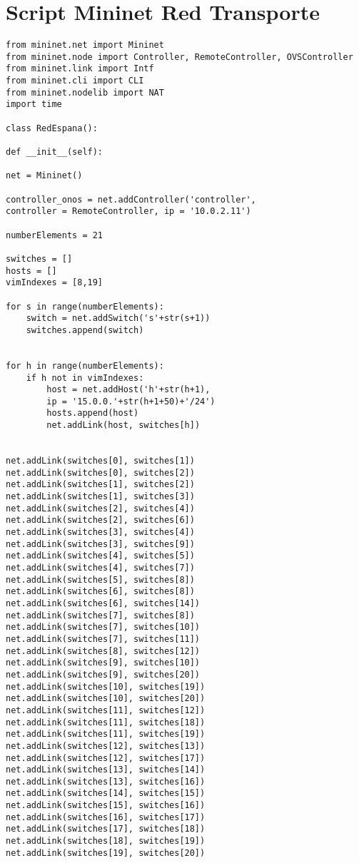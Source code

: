 \chapter{Script Mininet Red Transporte}
\label{sec:scriptmininet}

\begin{lstlisting}
from mininet.net import Mininet
from mininet.node import Controller, RemoteController, OVSController
from mininet.link import Intf
from mininet.cli import CLI
from mininet.nodelib import NAT
import time

class RedEspana():

def __init__(self):

net = Mininet()

controller_onos = net.addController('controller', 
controller = RemoteController, ip = '10.0.2.11')

numberElements = 21

switches = []
hosts = []
vimIndexes = [8,19]

for s in range(numberElements):
	switch = net.addSwitch('s'+str(s+1))
	switches.append(switch)


for h in range(numberElements):
	if h not in vimIndexes:
		host = net.addHost('h'+str(h+1), 
		ip = '15.0.0.'+str(h+1+50)+'/24')
		hosts.append(host)
		net.addLink(host, switches[h])


net.addLink(switches[0], switches[1])
net.addLink(switches[0], switches[2])
net.addLink(switches[1], switches[2])
net.addLink(switches[1], switches[3])
net.addLink(switches[2], switches[4])
net.addLink(switches[2], switches[6])
net.addLink(switches[3], switches[4])
net.addLink(switches[3], switches[9])
net.addLink(switches[4], switches[5])
net.addLink(switches[4], switches[7])
net.addLink(switches[5], switches[8])
net.addLink(switches[6], switches[8])
net.addLink(switches[6], switches[14])
net.addLink(switches[7], switches[8])
net.addLink(switches[7], switches[10])
net.addLink(switches[7], switches[11])
net.addLink(switches[8], switches[12])
net.addLink(switches[9], switches[10])
net.addLink(switches[9], switches[20])
net.addLink(switches[10], switches[19])
net.addLink(switches[10], switches[20])
net.addLink(switches[11], switches[12])
net.addLink(switches[11], switches[18])
net.addLink(switches[11], switches[19])
net.addLink(switches[12], switches[13])
net.addLink(switches[12], switches[17])
net.addLink(switches[13], switches[14])
net.addLink(switches[13], switches[16])
net.addLink(switches[14], switches[15])
net.addLink(switches[15], switches[16])
net.addLink(switches[16], switches[17])
net.addLink(switches[17], switches[18])
net.addLink(switches[18], switches[19])
net.addLink(switches[19], switches[20])


\end{lstlisting}
